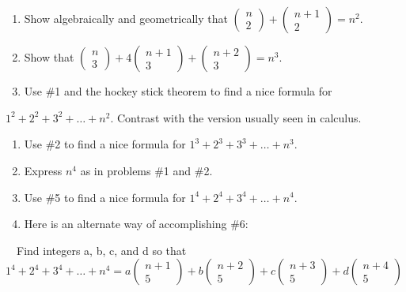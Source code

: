 \documentclass{article}
\begin{document}
\section{}
\begin{enumerate}
\item Show algebraically and geometrically that
$\left(\begin{matrix}n\\2\end{matrix}\right)+\left(\begin{matrix}n+1\\2\end{matrix}\right)=n^2$. 
\item Show that 
$\left(\begin{matrix}n\\3\end{matrix}\right)+4\left(\begin{matrix}n+1\\3\end{matrix}\right)+\left(\begin{matrix}n+2\\3\end{matrix}\right)=n^3$.
\item Use \#1 and the hockey stick theorem to find a nice formula for 
\end{enumerate}
 $1^2+2^2+3^2+{\dots}+n^2$. Contrast with the version usually seen in calculus. 

\begin{enumerate}
\item Use \#2 to find a nice formula for  $1^3+2^3+3^3+{\dots}+n^3$.
\item Express  $n^4$ as in problems \#1 and \#2. 
\item Use \#5 to find a nice formula for  $1^4+2^4+3^4+{\dots}+n^4$.
\item Here is an alternate way of accomplishing \#6:
\end{enumerate}
\ \ Find integers a, b, c, and d so that 
$1^4+2^4+3^4+{\dots}+n^4=a\left(\begin{matrix}n+1\\5\end{matrix}\right)+b\left(\begin{matrix}n+2\\5\end{matrix}\right)+c\left(\begin{matrix}n+3\\5\end{matrix}\right)+d\left(\begin{matrix}n+4\\5\end{matrix}\right)$
\end{document}
